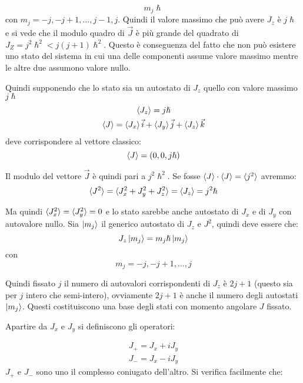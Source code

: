 \begin{equation}
m_j\hslash
\end{equation}
con $m_j=-j,-j+1,\dots,j-1,j$. Quindi il valore massimo che può avere $J_z$ è
$j\hslash$ e si  vede che il modulo quadro di $\vec{J}$ è più grande del
quadrato di $J_Z=j^2\hslash^2<j(j+1)\hslash^2$. Questo è conseguenza del fatto 
che
non può esistere uno stato del sistema in cui una delle componenti assume 
valore
massimo mentre le altre due assumono valore nullo.

Quindi supponendo che lo stato sia un autostato di $J_z$ quello con valore
massimo $j\hslash$
\begin{gather}
\braket{J_z}=j\hslash\\
\braket{J}=\braket{J_x}\vec{i}+\braket{J_y}\vec{j}+\braket{J_z}\vec{k}
\end{gather}
deve corrispondere al vettore classico:
\begin{equation}
\braket{J}=(0,0,j\hslash)
\end{equation}

Il modulo del vettore $\vec{J}$ è quindi pari a $j^2\hslash^2$. Se fosse
$\braket{J}\cdot \braket{J}=\braket{j^2}$ avremmo:
\begin{equation}
\braket{J^2}=\braket{J_x^2+J_y^2+J_z^2}=\braket{J_z}=j^2\hslash
\end{equation}

Ma quindi $\braket{J_x^2}=\braket{J_y^2}=0$ e lo stato sarebbe anche autostato
di $J_x$ e di $J_y$ con autovalore nullo.
\breaknote
Sia $\ket{m_j}$ il generico autostato di $J_z$ e $J^2$,
quindi deve essere che:
\begin{equation}
J_z\ket{m_j}=m_j\hslash \ket{m_j}
\end{equation}
con 
\begin{equation}
m_j=-j,-j+1,\dots,j
\end{equation}

Quindi fissato $j$ il numero di autovalori corrispondenti di $J_z$ è $2j+1$
(questo sia per $j$ intero che semi-intero), ovviamente $2j+1$ è anche il 
numero
degli autostati
$\ket{m_j}$. Questi costituiscono una base degli stati con momento angolare $J$
fissato.

Apartire da $J_x$ e $J_y$ si definiscono gli operatori:

\begin{gather}
J_+ =J_x+iJ_y\\
J_- =J_x-iJ_y
\end{gather}
$J_+$ e $J_-$ sono uno il complesso coniugato dell'altro. Si verifica facilmente
che:

